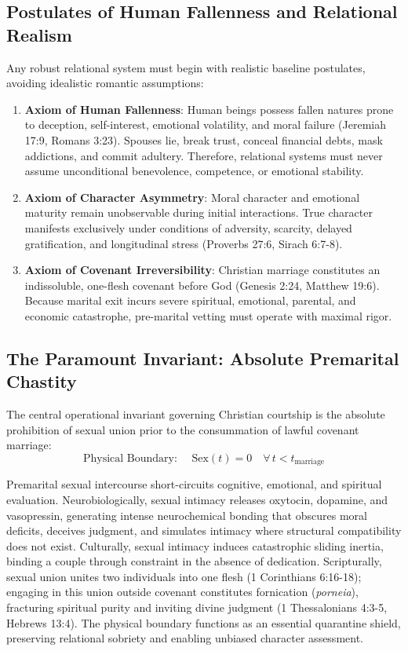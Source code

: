 \documentclass[11pt,twocolumn]{article}
\begin{document}
\subsection{Postulates of Human Fallenness and Relational Realism}
Any robust relational system must begin with realistic baseline postulates, avoiding idealistic romantic assumptions:
\begin{enumerate}
    \item \textbf{Axiom of Human Fallenness}: Human beings possess fallen natures prone to deception, self-interest, emotional volatility, and moral failure (Jeremiah 17:9, Romans 3:23). Spouses lie, break trust, conceal financial debts, mask addictions, and commit adultery. Therefore, relational systems must never assume unconditional benevolence, competence, or emotional stability.
    \item \textbf{Axiom of Character Asymmetry}: Moral character and emotional maturity remain unobservable during initial interactions. True character manifests exclusively under conditions of adversity, scarcity, delayed gratification, and longitudinal stress (Proverbs 27:6, Sirach 6:7-8).
    \item \textbf{Axiom of Covenant Irreversibility}: Christian marriage constitutes an indissoluble, one-flesh covenant before God (Genesis 2:24, Matthew 19:6). Because marital exit incurs severe spiritual, emotional, parental, and economic catastrophe, pre-marital vetting must operate with maximal rigor.
\end{enumerate}

\subsection{The Paramount Invariant: Absolute Premarital Chastity}
The central operational invariant governing Christian courtship is the absolute prohibition of sexual union prior to the consummation of lawful covenant marriage:
\begin{equation}
    \text{Physical Boundary: } \quad \text{Sex}(t) = 0 \quad \forall \, t < t_{\text{marriage}}
\end{equation}

Premarital sexual intercourse short-circuits cognitive, emotional, and spiritual evaluation. Neurobiologically, sexual intimacy releases oxytocin, dopamine, and vasopressin, generating intense neurochemical bonding that obscures moral deficits, deceives judgment, and simulates intimacy where structural compatibility does not exist. Culturally, sexual intimacy induces catastrophic sliding inertia, binding a couple through constraint in the absence of dedication. Scripturally, sexual union unites two individuals into one flesh (1 Corinthians 6:16-18); engaging in this union outside covenant constitutes fornication (\textit{porneia}), fracturing spiritual purity and inviting divine judgment (1 Thessalonians 4:3-5, Hebrews 13:4). The physical boundary functions as an essential quarantine shield, preserving relational sobriety and enabling unbiased character assessment.
\end{document}
